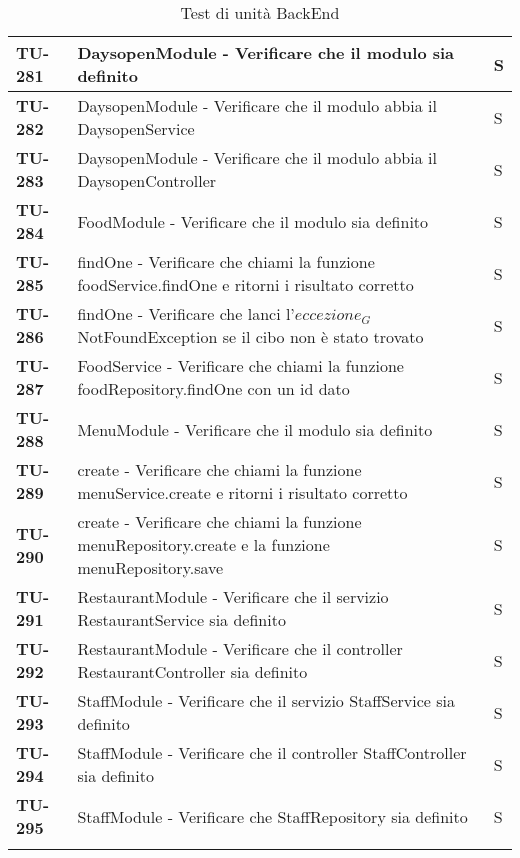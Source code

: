 \begin{longtable}{|>{\centering\arraybackslash}p{2cm}|p{15cm}|p{1cm}|}
  \rowcolor{gray!10}
  \textbf{TU-281} & DaysopenModule - Verificare che il modulo sia definito  & S \\ 
  \hline
  \rowcolor{gray!10}
  \textbf{TU-282} & DaysopenModule - Verificare che il modulo abbia il DaysopenService  & S \\ 
  \hline
  \rowcolor{gray!10}
  \textbf{TU-283} & DaysopenModule - Verificare che il modulo abbia il DaysopenController  & S \\ 
  \hline
  \rowcolor{gray!10}
  \textbf{TU-284} & FoodModule - Verificare che il modulo sia definito  & S \\ 
  \hline
  \rowcolor{gray!10}
  \textbf{TU-285} & findOne - Verificare che chiami la funzione foodService.findOne e ritorni i risultato corretto & S \\ 
  \hline
  \rowcolor{gray!10}
  \textbf{TU-286} & findOne - Verificare che lanci l'$\textit{eccezione}_G$ NotFoundException se il cibo non è stato trovato & S \\ 
  \hline
  \rowcolor{gray!10}
  \textbf{TU-287} & FoodService - Verificare che chiami la funzione foodRepository.findOne con un id dato & S \\ 
  \hline
  \rowcolor{gray!10}
  \textbf{TU-288} & MenuModule - Verificare che il modulo sia definito & S \\ 
  \hline
  \rowcolor{gray!10}
  \textbf{TU-289} & create - Verificare che chiami la funzione menuService.create e ritorni i risultato corretto & S \\ 
  \hline
  \rowcolor{gray!10}
  \textbf{TU-290} & create - Verificare che chiami la funzione menuRepository.create e la funzione menuRepository.save & S \\ 
  \hline
  \rowcolor{gray!10}
  \textbf{TU-291} & RestaurantModule - Verificare che il servizio RestaurantService sia definito & S \\ 
  \hline
  \rowcolor{gray!10}
  \textbf{TU-292} & RestaurantModule - Verificare che il controller RestaurantController sia definito & S \\ 
  \hline
  \rowcolor{gray!10}
  \textbf{TU-293} & StaffModule - Verificare che il servizio StaffService sia definito & S \\ 
  \hline
  \rowcolor{gray!10}
  \textbf{TU-294} & StaffModule - Verificare che il controller StaffController sia definito & S \\ 
  \hline
  \rowcolor{gray!10}
  \textbf{TU-295} & StaffModule - Verificare che StaffRepository sia definito & S \\ 
  \hline
  


  
  \caption{Test di unità BackEnd} 
    \label{tab:test_unita}
\end{longtable}

